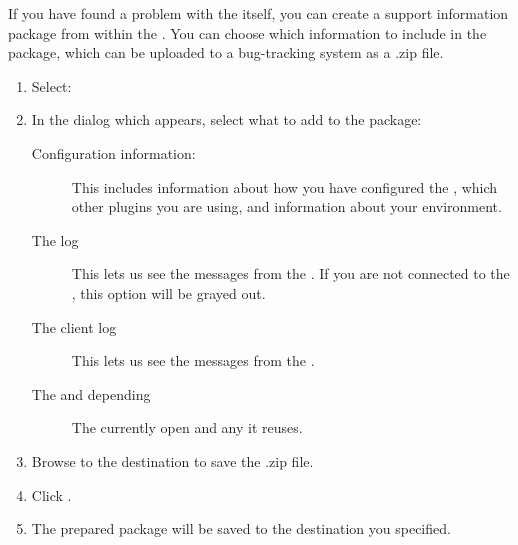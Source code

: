 

If you have found a problem with the \ite{} itself, you can create a support information package from  within the \ite{}. You can choose which information to include in the package, which can be uploaded to a bug-tracking system as a .zip file.

\begin{enumerate}
\item Select:\\
\item In the dialog which appears, select what to add to the package: 
\begin{description}
\item [Configuration information:]{This includes information about how you have configured the \ite{}, which other plugins you are using, and information about your environment. }
\item [The \gdagent{} log]{This lets us see the messages from the \gdagent{}. If you are not connected to the \gdagent{}, this option will be grayed out. }
\item [The client log]{This lets us see the messages from the \ite{}. }
\item [The \gdproject{} and depending \gdprojects{}]{The currently open \gdproject{} and any \gdprojects{} it reuses.}
\end{description}
\item Browse to the destination to save the .zip file.
\item Click . 
\item The prepared package will be saved to the destination you specified.
\end{enumerate}
